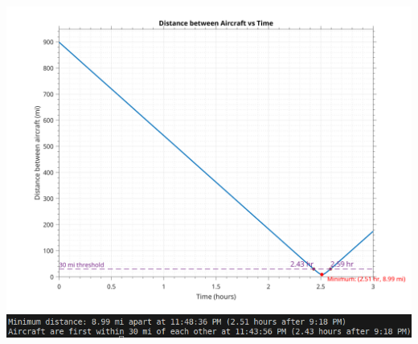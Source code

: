 \documentclass[a4paper, 12pt]{report}
\def\link{blue!50!black}
\begin{document}
    
    

    \includegraphics[width=1\textwidth]{images/aircraft_distance_plot.png}
    \includegraphics[width=1\textwidth]{images/q10.png}
    
    \newpage
    
\end{document}
